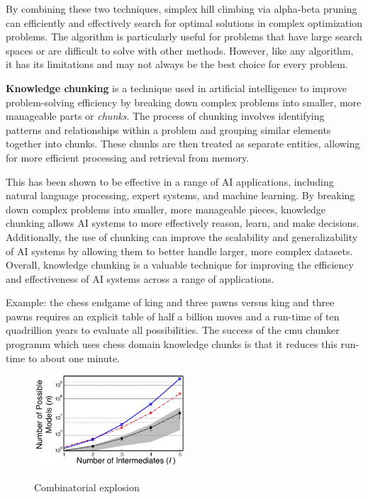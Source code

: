 By combining these two techniques, simplex hill climbing via alpha-beta pruning can efficiently and effectively search for optimal 
solutions in complex optimization problems. The algorithm is particularly useful for problems that have large search spaces or are 
difficult to solve with other methods. However, like any algorithm, it has its limitations and may not always be the best choice 
for every problem. \cite{pruning}

\textbf{Knowledge chunking} is a technique used in artificial intelligence to improve problem-solving efficiency by breaking down complex problems 
into smaller, more manageable parts or \emph{chunks}. The process of chunking involves identifying patterns and relationships within a problem 
and grouping similar elements together into chunks. These chunks are then treated as separate entities, allowing for more efficient processing and retrieval from memory.

This has been shown to be effective in a range of AI applications, including natural language processing, expert systems, 
and machine learning. By breaking down complex problems into smaller, more manageable pieces, knowledge chunking allows AI systems to 
more effectively reason, learn, and make decisions. Additionally, the use of chunking can improve the scalability and generalizability 
of AI systems by allowing them to better handle larger, more complex datasets. Overall, knowledge chunking is a valuable technique for 
improving the efficiency and effectiveness of AI systems across a range of applications. \cite{knowledgechunking}

Example: the chess endgame of king and three pawns versus king 
and three pawns requires an explicit table of half a billion 
moves and a run-time of ten quadrillion years to evaluate all
possibilities. The success of the cmu chunker programm which
uses chess domain knowledge chunks is that it reduces this
run-time to about one minute.
\\
\begin{figure}[htb]
    \centering
    \includegraphics[width=0.5\textwidth]{pics/combiexplo.png}
    \caption{Combinatorial explosion} 
    \cite{combiexplo}
    \label{fig:combiexplo}
\end{figure}
\\
\newpage
